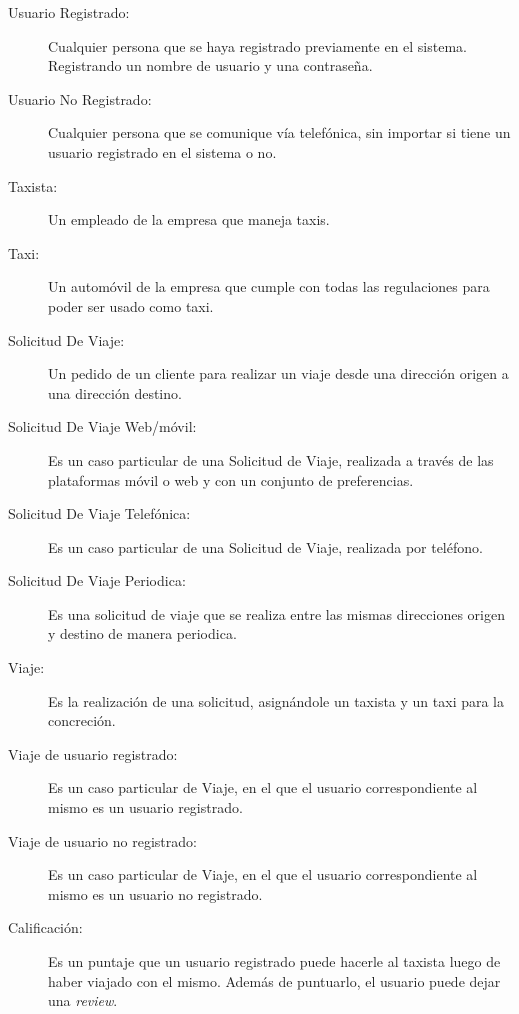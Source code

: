 \documentclass[a4paper, 10pt, twoside]{article}
\begin{document}
\begin{description} %
  \item[Usuario Registrado:] Cualquier persona que se haya registrado previamente en el sistema. Registrando un nombre de usuario y una contraseña.

  \item[Usuario No Registrado:] Cualquier persona que se comunique vía telefónica, sin importar si tiene un usuario registrado en el sistema o no.

  \item[Taxista:] Un empleado de la empresa que maneja taxis.

  \item[Taxi:] Un automóvil de la empresa que cumple con todas las regulaciones para poder ser usado como taxi.

  \item[Solicitud De Viaje:] Un pedido de un cliente para realizar un viaje desde una dirección origen a una dirección destino.

  \item[Solicitud De Viaje Web/móvil:] Es un caso particular de una Solicitud de Viaje, realizada a través de las plataformas móvil o web y con un conjunto de preferencias.

  \item[Solicitud De Viaje Telefónica:] Es un caso particular de una Solicitud de Viaje, realizada por teléfono.

  \item[Solicitud De Viaje Periodica:] Es una solicitud de viaje que se realiza entre las mismas direcciones origen y destino de manera periodica. %
  
  \item[Viaje:] Es la realización de una solicitud, asignándole un taxista y un taxi para la concreción.
  
  \item[Viaje de usuario registrado:] Es un caso particular de Viaje, en el que el usuario correspondiente al mismo es un usuario registrado.

  \item[Viaje de usuario no registrado:] Es un caso particular de Viaje, en el que el usuario correspondiente al mismo es un usuario no registrado.
  
  \item[Calificación:] Es un puntaje que un usuario registrado puede hacerle al taxista luego de haber viajado con el mismo. Además de puntuarlo, el usuario puede dejar una \emph{review}.


\end{description}
\end{document}
